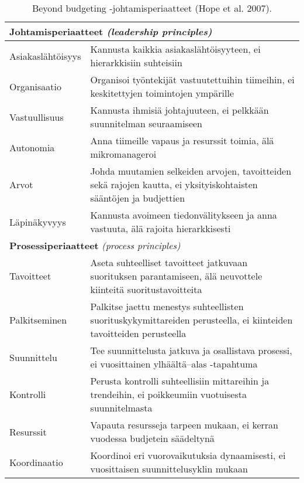 \documentclass[12pt,a4paper,oneside,pdftex]{report}
\begin{document}
\begin{table}
\begin{tabular}{|p{3cm}|p{10cm}|}

\hline  %
\multicolumn{2}{|p{13cm}|}{\textbf{Johtamisperiaatteet} \emph{(leadership principles)}} \\
\hline
Asiakaslähtöisyys & Kannusta kaikkia asiakaslähtöisyyteen, ei hierarkkisiin suhteisiin \\
\hline
Organisaatio & Organisoi työntekijät vastuutettuihin tiimeihin, ei keskitettyjen toimintojen ympärille \\
\hline
Vastuullisuus & Kannusta ihmisiä johtajuuteen, ei pelkkään suunnitelman seuraamiseen \\
\hline
Autonomia & Anna tiimeille vapaus ja resurssit toimia, älä mikromanageroi \\
\hline
Arvot & Johda muutamien selkeiden arvojen, tavoitteiden sekä rajojen kautta, ei yksityiskohtaisten sääntöjen ja budjettien \\
\hline
Läpinäkyvyys & Kannusta avoimeen tiedonvälitykseen ja anna vastuuta, älä rajoita hierarkkisesti \\
\hline
\multicolumn{2}{|p{13cm}|}{\textbf{Prosessiperiaatteet} \emph{(process principles)}} \\
\hline
Tavoitteet & Aseta suhteelliset tavoitteet jatkuvaan suorituksen parantamiseen, älä neuvottele kiinteitä suoritustavoitteita \\
\hline
Palkitseminen & Palkitse jaettu menestys suhteellisten suorituskykymittareiden perusteella, ei kiinteiden tavoitteiden perusteella \\
\hline
Suunnittelu & Tee suunnittelusta jatkuva ja osallistava prosessi, ei vuosittainen ylhäältä–alas -tapahtuma \\
\hline
Kontrolli & Perusta kontrolli suhteellisiin mittareihin ja trendeihin, ei poikkeumiin vuotuisesta suunnitelmasta \\
\hline
Resurssit & Vapauta resursseja tarpeen mukaan, ei kerran vuodessa budjetein säädeltynä \\
\hline
Koordinaatio & Koordinoi eri vuorovaikutuksia dynaamisesti, ei vuosittaisen suunnittelusyklin mukaan \\
\hline

\end{tabular} %
\caption{Beyond budgeting -johtamisperiaatteet (Hope et al. 2007).}
\label{table:bb}
\end{table} %
\end{document}
